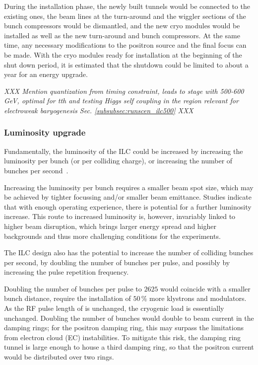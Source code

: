 During the installation phase, the newly built tunnels would be connected to the existing ones, the beam lines at the turn-around and the wiggler sections of the bunch compressors would be dismantled, and the new cryo modules would be installed as well as the new turn-around and bunch compressors. 
At the same time, any necessary modifications to the positron source and the final focus can be made.
With the cryo modules ready for installation at the beginning of the shut down period, it is estimated that the shutdown could be limited to about a year for an energy upgrade.

{\it XXX Mention quantization from timing constraint, leads to stage with 500-600 GeV, optimal for tth and testing Higgs self coupling in the region relevant for electroweak baryogenesis Sec. \ref{subsubsec:runscen_ilc500} XXX }

\subsubsection{Luminosity upgrade}
\label{subsubsec:upg-optL}

Fundamentally, the luminosity of the ILC could be increased by increasing the luminosity per bunch (or per colliding charge), or increasing the number of bunches per second~\cite{Harrison:2013nva}.

Increasing the luminosity per bunch requires a smaller beam spot size, which may be achieved by tighter focussing and/or smaller beam emittance.
Studies indicate that with enough operating experience, there is potential for a further luminosity increase. 
This route to increased luminosity is, however, invariably linked to higher beam disruption, which brings larger energy spread and higher backgrounds and thus more challenging conditions for the experiments.

The ILC design also has the potential to increase the number of colliding bunches per second, by doubling the number of bunches per pulse, and possibly by increasing the pulse repetition frequency.

Doubling the number of bunches per pulse to $2625$ would coincide with a smaller bunch distance, require the installation of $50\,\%$ more klystrons and modulators. 
As the RF pulse length of  is unchanged, the cryogenic load is essentially unchanged.
Doubling the number of bunches would double to beam current in the damping rings;
for the positron damping ring, this may surpass the limitations from electron cloud (EC) instabilities. 
To mitigate this risk, the damping ring tunnel is large enough to house a third damping ring, so that the positron current would be distributed over two rings.

